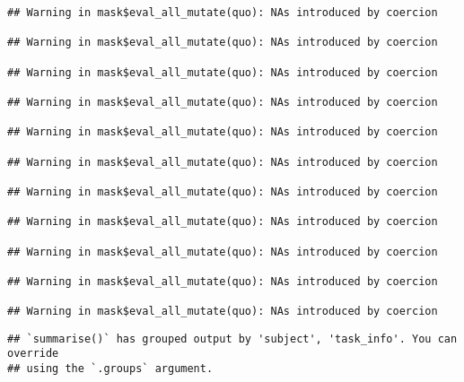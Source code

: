 \documentclass[
]{article}
\begin{document}
\begin{verbatim}
## Warning in mask$eval_all_mutate(quo): NAs introduced by coercion

## Warning in mask$eval_all_mutate(quo): NAs introduced by coercion

## Warning in mask$eval_all_mutate(quo): NAs introduced by coercion

## Warning in mask$eval_all_mutate(quo): NAs introduced by coercion

## Warning in mask$eval_all_mutate(quo): NAs introduced by coercion

## Warning in mask$eval_all_mutate(quo): NAs introduced by coercion

## Warning in mask$eval_all_mutate(quo): NAs introduced by coercion

## Warning in mask$eval_all_mutate(quo): NAs introduced by coercion

## Warning in mask$eval_all_mutate(quo): NAs introduced by coercion

## Warning in mask$eval_all_mutate(quo): NAs introduced by coercion

## Warning in mask$eval_all_mutate(quo): NAs introduced by coercion
\end{verbatim}

\begin{verbatim}
## `summarise()` has grouped output by 'subject', 'task_info'. You can override
## using the `.groups` argument.
\end{verbatim}
\end{document}

